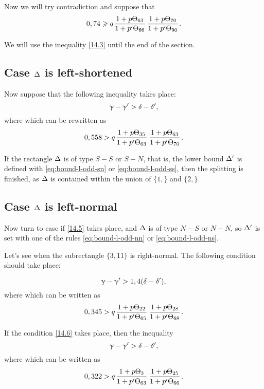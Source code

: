 Now we will try contradiction and suppose that
\begin{equation}\label{14.3}
	0,74 \geqslant q \up{63}{66} \up{70}{90}.
\end{equation}

We will use the inequality \ref{14.3} until the end of the section.


\subsection{Case $\Delta$ is left-shortened}

Now suppose that the following inequality takes place:
\begin{equation*}
	\upgamma - \upgamma' > \delta - \delta',
\end{equation*}
where
which can be rewritten as
\begin{equation}\label{14.5}
	0,558 > q \up{35}{63} \up{63}{70}.
\end{equation}

If the rectangle $\Delta$ is of type $S-S$ or $S-N$,
that is, the lower bound $\Delta'$ is defined with \ref{eq:bound-l-odd-sn} or \ref{eq:bound-l-odd-ss},
then the splitting is finished, as $\Delta$ is contained within the union of $\{1,\}$ and $\{2,\}$.


\subsection{Case $\Delta$ is left-normal}

Now turn to case if \ref{14.5} takes place,
and $\Delta$ is of type $N-S$ or $N-N$,
so $\Delta'$ is set with one of the rules \ref{eq:bound-l-odd-nn} or \ref{eq:bound-l-odd-ns}.

Let's see when the subrectangle $\{3, 11\}$ is right-normal.
The following condition should take place:


\begin{equation*}
	\upgamma - \upgamma' > 1,4 (\delta - \delta'),
\end{equation*}
where
which can be written as
\begin{equation}\label{14.6}
	0,345 > q \up{22}{65} \up{28}{68}.
\end{equation}

If the condition \ref{14.6} takes place, then
the inequality
\begin{equation*}
	\upgamma - \upgamma' > \delta - \delta',
\end{equation*}
where
which can be written as
\begin{equation}\label{14.7}
	0,322 > q \up{3}{63} \up{25}{66}.
\end{equation}

